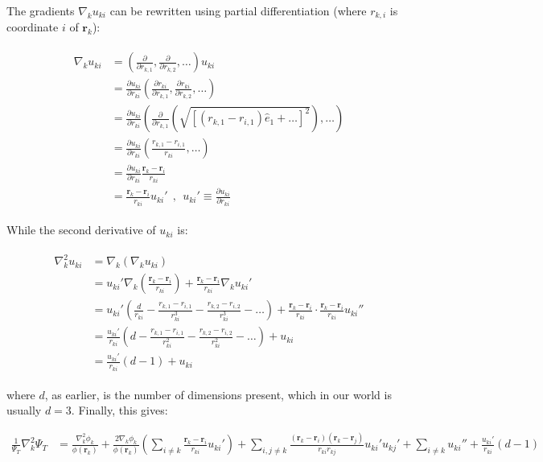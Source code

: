 \documentclass[english, a4paper]{article}
\newcommand{\bm}[1]{\mathbf{#1}}
\begin{document}
The gradients $\nabla_k u_{ki}$ can be rewritten using partial differentiation (where $r_{k,i}$ is coordinate $i$ of $\bm{r}_k$):

\begin{align}
	\begin{split}
	\nabla_k u_{ki} &= \left(\frac{\partial}{\partial r_{k,1}}, \frac{\partial}{\partial r_{k,2}}, \ldots\right)u_{ki}\\
	&= \frac{\partial u_{ki}}{\partial r_{ki}}\left(\frac{\partial r_{ki}}{\partial r_{k,1}}, \frac{\partial r_{ki}}{\partial r_{k,2}}, \ldots\right)\\
	&= \frac{\partial u_{ki}}{\partial r_{ki}}\left( \frac{\partial}{\partial r_{k,1}}\left(\sqrt{\left[(r_{k,1}-r_{i,1})\hat{e}_1 + \ldots\right]^2}\right), \ldots \right)\\
	&= \frac{\partial u_{ki}}{\partial r_{ki}}\left(\frac{r_{k,1} - r_{i,1}}{r_{ki}}, \ldots \right)\\
	&= \frac{\partial u_{ki}}{\partial r_{ki}}\frac{\bm{r}_k - \bm{r}_i}{r_{ki}}\\
	&= \frac{\bm{r}_k - \bm{r}_i}{r_{ki}} u_{ki}' \:\:,\:\:  u_{ki}'\equiv \frac{\partial u_{ki}}{\partial r_{ki}}
	\end{split}
\end{align}

While the second derivative of $u_{ki}$ is:

\begin{align}
	\begin{split}
	\nabla_k^2 u_{ki} &= \nabla_k(\nabla_ku_{ki})\\
	&= u_{ki}'\nabla_k\left(\frac{\bm{r}_k - \bm{r}_i}{r_{ki}}\right) + \frac{\bm{r}_k - \bm{r}_i}{r_{ki}}\nabla_k u_{ki}'\\
	&= u_{ki}' \left(\frac{d}{r_{ki}} - \frac{r_{k,1}-r_{i,1}}{r_{ki}^3} - \frac{r_{k,2}-r_{i,2}}{r_{ki}^3} - \ldots\right) + \frac{\bm{r}_k - \bm{r}_i}{r_{ki}}\cdot\frac{\bm{r}_k - \bm{r}_i}{r_{ki}} u_{ki}''\\
	&= \frac{u_{ki}'}{r_{ki}} \left(d - \frac{r_{k,1}-r_{i,1}}{r_{ki}^2} - \frac{r_{k,2}-r_{i,2}}{r_{ki}^2} - \ldots\right) + u_{ki}\\
	&= \frac{u_{ki}'}{r_{ki}} \left(d - 1\right) + u_{ki}
	\end{split}
\end{align}

where $d$, as earlier, is the number of dimensions present, which in our world is usually $d=3$. Finally, this gives:

\begin{align}
\frac{1}{\Psi_T}\nabla_k^2\Psi_T &= \frac{\nabla_k^2\phi_k}{\phi(\bm{r}_k)} + \frac{2\nabla_k\phi_k}{\phi(\bm{r}_k)}\left(\sum_{i\neq k} \frac{\bm{r}_k - \bm{r}_i}{r_{ki}} u_{ki}' \right) + \sum_{i,j\neq k}\frac{(\bm{r}_k - \bm{r}_i)(\bm{r}_k - \bm{r}_j)}{r_{ki}r_{kj}}u_{ki}'u_{kj}' + \sum_{i\neq k} u_{ki}'' + \frac{u_{ki}'}{r_{ki}} \left(d - 1\right)
\label{eq:full_second_derivative}
\end{align}
\end{document}
